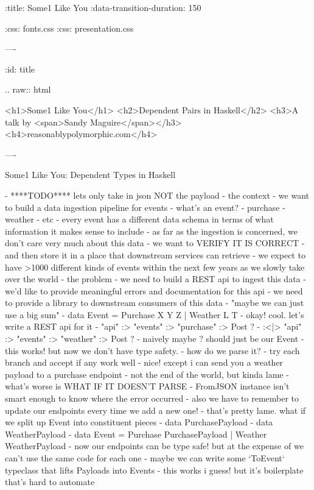 :title: Some1 Like You
:data-transition-duration: 150

:css: fonts.css
:css: presentation.css

----

:id: title

.. raw:: html

  <h1>Some1 Like You</h1>
  <h2>Dependent Pairs in Haskell</h2>
  <h3>A talk by <span>Sandy Maguire</span></h3>
  <h4>reasonablypolymorphic.com</h4>

----

Some1 Like You: Dependent Types in Haskell

- ****TODO**** lets only take in json NOT the payload
- the context
  - we want to build a data ingestion pipeline for events
  - what's an event?
    - purchase
    - weather
    - etc
  - every event has a different data schema in terms of what information it makes sense to include
  - as far as the ingestion is concerned, we don't care very much about this data
    - we want to VERIFY IT IS CORRECT
    - and then store it in a place that downstream services can retrieve
  - we expect to have >1000 different kinds of events within the next few years as we slowly take over the world
- the problem
  - we need to build a REST api to ingest this data
    - we'd like to provide meaningful errors and documentation for this api
  - we need to provide a library to downstream consumers of this data
- "maybe we can just use a big sum"
  - data Event = Purchase X Y Z | Weather L T
  - okay! cool. let's write a REST api for it
  - "api" :> "events" :> "purchase" :> Post ?
    - :<|> "api" :> "events" :> "weather" :> Post ?
  - naively maybe ? should just be our Event
  - this works! but now we don't have type safety.
    - how do we parse it?
    - try each branch and accept if any work well
    - nice! except i can send you a weather payload to a purchase endpoint
      - not the end of the world, but kinda lame
    - what's worse is WHAT IF IT DOESN'T PARSE
      - FromJSON instance isn't smart enough to know where the error occurred
    - also we have to remember to update our endpoints every time we add a new one!
  - that's pretty lame. what if we split up Event into constituent pieces
    - data PurchasePayload
      - data WeatherPayload
      - data Event = Purchase PurchasePayload | Weather WeatherPayload
    - now our endpoints can be type safe! but at the expense of we can't use the same code for each one
      - maybe we can write some `ToEvent` typeclass that lifts Payloads into Events
      - this works i guess! but it's boilerplate that's hard to automate
